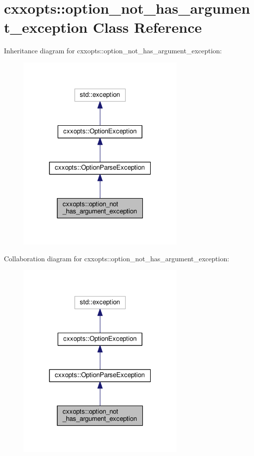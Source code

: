 \hypertarget{classcxxopts_1_1option__not__has__argument__exception}{}\section{cxxopts\+:\+:option\+\_\+not\+\_\+has\+\_\+argument\+\_\+exception Class Reference}
\label{classcxxopts_1_1option__not__has__argument__exception}


Inheritance diagram for cxxopts\+:\+:option\+\_\+not\+\_\+has\+\_\+argument\+\_\+exception\+:
\nopagebreak
\begin{figure}[H]
\begin{center}
\leavevmode
\includegraphics[width=235pt]{classcxxopts_1_1option__not__has__argument__exception__inherit__graph}
\end{center}
\end{figure}


Collaboration diagram for cxxopts\+:\+:option\+\_\+not\+\_\+has\+\_\+argument\+\_\+exception\+:
\nopagebreak
\begin{figure}[H]
\begin{center}
\leavevmode
\includegraphics[width=235pt]{classcxxopts_1_1option__not__has__argument__exception__coll__graph}
\end{center}
\end{figure}
